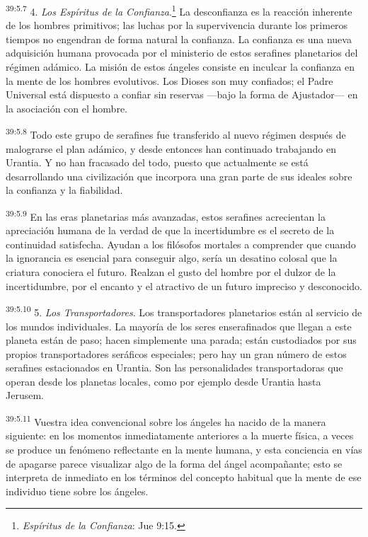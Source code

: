 \par
\textsuperscript{39:5.7} 4. \textit{Los Espíritus de la Confianza}.\footnote{\textit{Espíritus de la Confianza}: Jue 9:15.} La desconfianza es la reacción inherente de los hombres primitivos; las luchas por la supervivencia durante los primeros tiempos no engendran de forma natural la confianza. La confianza es una nueva adquisición humana provocada por el ministerio de estos serafines planetarios del régimen adámico. La misión de estos ángeles consiste en inculcar la confianza en la mente de los hombres evolutivos. Los Dioses son muy confiados; el Padre Universal está dispuesto a confiar sin reservas ---bajo la forma de Ajustador--- en la asociación con el hombre.

\par
\textsuperscript{39:5.8} Todo este grupo de serafines fue transferido al nuevo régimen después de malograrse el plan adámico, y desde entonces han continuado trabajando en Urantia. Y no han fracasado del todo, puesto que actualmente se está desarrollando una civilización que incorpora una gran parte de sus ideales sobre la confianza y la fiabilidad.

\par
\textsuperscript{39:5.9} En las eras planetarias más avanzadas, estos serafines acrecientan la apreciación humana de la verdad de que la incertidumbre es el secreto de la continuidad satisfecha. Ayudan a los filósofos mortales a comprender que cuando la ignorancia es esencial para conseguir algo, sería un desatino colosal que la criatura conociera el futuro. Realzan el gusto del hombre por el dulzor de la incertidumbre, por el encanto y el atractivo de un futuro impreciso y desconocido.

\par
\textsuperscript{39:5.10} 5. \textit{Los Transportadores}. Los transportadores planetarios están al servicio de los mundos individuales. La mayoría de los seres enserafinados que llegan a este planeta están de paso; hacen simplemente una parada; están custodiados por sus propios transportadores seráficos especiales; pero hay un gran número de estos serafines estacionados en Urantia. Son las personalidades transportadoras que operan desde los planetas locales, como por ejemplo desde Urantia hasta Jerusem.

\par
\textsuperscript{39:5.11} Vuestra idea convencional sobre los ángeles ha nacido de la manera siguiente: en los momentos inmediatamente anteriores a la muerte física, a veces se produce un fenómeno reflectante en la mente humana, y esta conciencia en vías de apagarse parece visualizar algo de la forma del ángel acompañante; esto se interpreta de inmediato en los términos del concepto habitual que la mente de ese individuo tiene sobre los ángeles.


